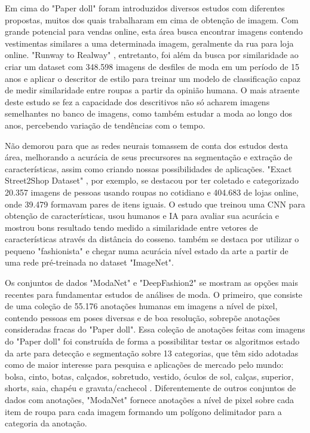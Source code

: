\documentclass[12pt]{report}
\begin{document}
Em cima do "Paper doll" foram introduzidos diversos estudos com diferentes propostas, muitos dos quais trabalharam em cima de obtenção de imagem. Com grande potencial para vendas online, esta área busca encontrar imagens contendo vestimentas similares a uma determinada imagem, geralmente da rua para loja online. "Runway to Realway" \cite{runway2realway}, entretanto, foi além da busca por similaridade ao criar um dataset com 348.598 imagens de desfiles de moda em um período de 15 anos e aplicar o descritor de estilo para treinar um modelo de classificação capaz de medir similaridade entre roupas a partir da opinião humana. O mais atraente deste estudo se fez a capacidade dos descritivos não só acharem imagens semelhantes no banco de imagens, como também estudar a moda ao longo dos anos, percebendo variação de tendências com o tempo. 

Não demorou para que as redes neurais tomassem de conta dos estudos desta área, melhorando a acurácia de seus precursores na segmentação e extração de características, assim como criando nossas possibilidades de aplicações. "Exact Street2Shop Dataset" \cite{wheretobuyit}, por exemplo, se destacou por ter coletado e categorizado 20.357 imagens de pessoas usando roupas no cotidiano e 404.683 de lojas online, onde 39.479 formavam pares de itens iguais. O estudo que treinou uma CNN para obtenção de características, usou humanos e IA para avaliar sua acurácia e mostrou bons resultado tendo medido a similaridade entre vetores de características através da distância do cosseno. \cite{parsing} também se destaca por utilizar o pequeno "fashionista" e chegar numa acurácia nível estado da arte a partir de uma rede pré-treinada no dataset "ImageNet". 

Os conjuntos de dados "ModaNet" \cite{modanet} e "DeepFashion2" \cite{deepfashion2} se mostram as opções mais recentes para fundamentar estudos de análises de moda. O primeiro, que consiste de uma coleção de 55.176 anotações humanas em imagens a nível de pixel, contendo pessoas em poses diversas e de boa resolução, sobrepõe anotações consideradas fracas do "Paper doll". Essa coleção de anotações feitas com imagens do "Paper doll" foi construída de forma a possibilitar testar os algoritmos estado da arte para detecção e segmentação sobre 13 categorias, que têm sido adotadas como de maior interesse para pesquisa e aplicações de mercado pelo mundo: bolsa, cinto, botas, calçados, sobretudo, vestido, óculos de sol, calças, superior, shorts, saia, chapéu e gravata/cachecol \cite{modanet}. Diferentemente de outros conjuntos de dados com anotações, "ModaNet" fornece anotações a nível de pixel sobre cada item de roupa para cada imagem formando um polígono delimitador para a categoria da anotação. 
\end{document}
